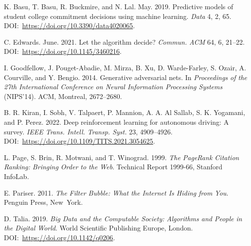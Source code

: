 \begin{thebibliography}{}
 K. Basu, T. Basu, R. Buckmire, and N. Lal. May. 2019. Predictive models of student college commitment decisions using machine learning. \textit{Data} 4, 2, 65. DOI:~\href{https://doi.org/10.3390/data4020065}{https://{\allowbreak}doi.{\allowbreak}org/{\allowbreak}10.{\allowbreak}3390/{\allowbreak}data4020065}.


 C. Edwards. June. 2021. Let the algorithm decide? \textit{Commun.} \textit{ACM} 64, 6, 21--22. DOI:~\href{https://doi.org/10.1145/3460216}{https://{\allowbreak}doi.{\allowbreak}org/{\allowbreak}10.{\allowbreak}1145/{\allowbreak}3460216}.

 I. Goodfellow, J. Pouget-Abadie, M. Mirza, B. Xu, D. Warde-Farley, S. Ozair, A. Courville, and Y. Bengio. 2014. Generative adversarial nets. In \textit{Proceedings of the 27th International Conference on Neural Information Processing Systems} (NIPS'14). ACM, Montreal, 2672--2680.


 B. R. Kiran, I. Sobh, V. Talpaert, P. Mannion, A. A. Al Sallab, S. K. Yogamani, and P. Perez. 2022. Deep reinforcement learning for autonomous driving: A survey. \textit{IEEE Trans. Intell. Transp. Syst.} 23, 4909--4926. DOI:~\href{https://doi.org/10.1109/TITS.2021.3054625}{https://{\allowbreak}doi.{\allowbreak}org/{\allowbreak}10.{\allowbreak}1109/{\allowbreak}TITS.{\allowbreak}2021.{\allowbreak}3054625}.


 L. Page, S. Brin, R. Motwani, and T. Winograd. 1999. \textit{The PageRank Citation Ranking: Bringing Order to the Web}. Technical Report 1999-66, Stanford InfoLab.

 E. Pariser. 2011. \textit{The Filter Bubble: What the Internet Is Hiding from You}. Penguin Press, \hbox{New York.}

 D. Talia. 2019. \textit{Big Data and the Computable Society: Algorithms and People in the Digital World}. World Scientific Publishing Europe, London. DOI:~\href{https://doi.org/10.1142/q0206}{https://{\allowbreak}doi.{\allowbreak}org/{\allowbreak}10.{\allowbreak}1142/{\allowbreak}q0206}.

\end{thebibliography}

%

